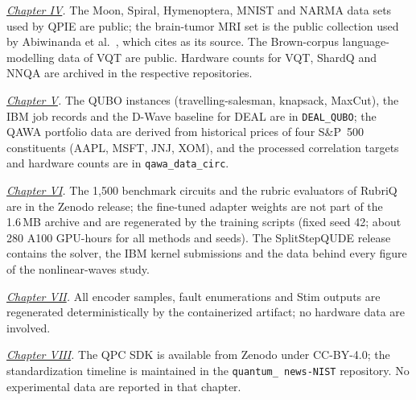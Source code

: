\documentclass{report}
\theoremstyle{plain}
\theoremstyle{definition}
\theoremstyle{remark}
\begin{document}
\emph{\hyperref[ch:qml]{Chapter IV}.} The Moon, Spiral, Hymenoptera, MNIST and NARMA data sets used by QPIE are public; the brain-tumor MRI set is the public collection used by Abiwinanda et al.~\cite{abiwinanda2019braintumor}, which \cite{guo2025qpie} cites as its source. The Brown-corpus language-modelling data of VQT are public. Hardware counts for VQT, ShardQ and NNQA are archived in the respective repositories.

\emph{\hyperref[ch:nisq]{Chapter V}.} The QUBO instances (travelling-salesman, knapsack, MaxCut), the IBM job records and the D-Wave baseline for DEAL are in \texttt{DEAL\_QUBO}; the QAWA portfolio data are derived from historical prices of four S\&P~500 constituents (AAPL, MSFT, JNJ, XOM), and the processed correlation targets and hardware counts are in \texttt{qawa\_data\_circ}.

\emph{\hyperref[ch:synthesis]{Chapter VI}.} The 1,500 benchmark circuits and the rubric evaluators of RubriQ are in the Zenodo release; the fine-tuned adapter weights are not part of the 1.6 MB archive and are regenerated by the training scripts (fixed seed 42; about 280 A100 GPU-hours for all methods and seeds). The SplitStepQUDE release contains the solver, the IBM kernel submissions and the data behind every figure of the nonlinear-waves study.

\emph{\hyperref[ch:qec]{Chapter VII}.} All encoder samples, fault enumerations and Stim outputs are regenerated deterministically by the containerized artifact; no hardware data are involved.

\emph{\hyperref[ch:pqc]{Chapter VIII}.} The QPC SDK is available from Zenodo under CC-BY-4.0; the standardization timeline is maintained in the \texttt{quantum\_  news-NIST} repository. No experimental data are reported in that chapter.
\end{document}
